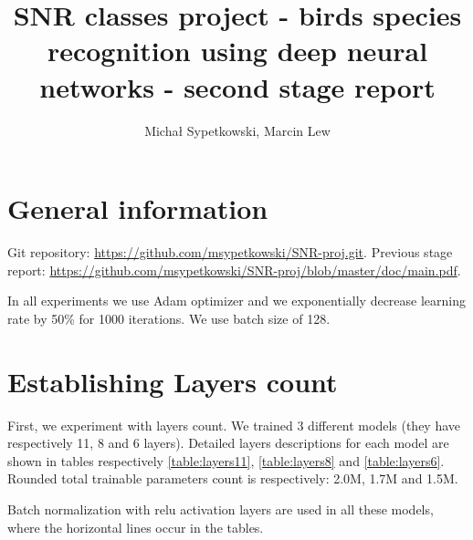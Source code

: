 \documentclass[a4paper]{article}
\begin{document}
\title{SNR classes project - birds species recognition using deep neural networks
- second stage report}

\author{Michał Sypetkowski, Marcin Lew}
\twocolumn
\maketitle


\section{General information}
Git repository:\newline
\url{https://github.com/msypetkowski/SNR-proj.git}.\newline
Previous stage report: \newline
\url{https://github.com/msypetkowski/SNR-proj/blob/master/doc/main.pdf}.

In all experiments we use Adam optimizer and we exponentially
decrease learning rate by 50\% for 1000 iterations.
We use batch size of 128.

\section{Establishing Layers count}
\label{expLayer}

First, we experiment with layers count.
    We trained 3 different models (they have respectively 11, 8 and 6 layers).
Detailed layers descriptions for each model are shown in tables respectively
\ref{table:layers11},
\ref{table:layers8} and
\ref{table:layers6}.
Rounded total trainable parameters count is respectively: 2.0M, 1.7M  and 1.5M.

Batch normalization with relu activation layers are used in all these models,
where the horizontal lines occur in the tables.
\end{document}
